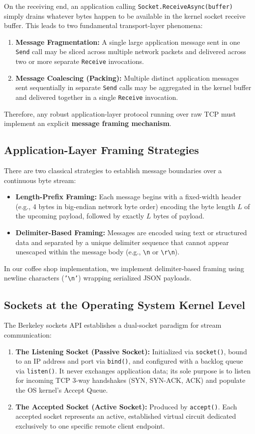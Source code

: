 \documentclass[12pt,a4paper]{article}
\begin{document}
On the receiving end, an application calling \texttt{Socket.ReceiveAsync(buffer)} simply drains whatever bytes happen to be available in the kernel socket receive buffer. This leads to two fundamental transport-layer phenomena:
\begin{enumerate}
    \item \textbf{Message Fragmentation:} A single large application message sent in one \texttt{Send} call may be sliced across multiple network packets and delivered across two or more separate \texttt{Receive} invocations.
    \item \textbf{Message Coalescing (Packing):} Multiple distinct application messages sent sequentially in separate \texttt{Send} calls may be aggregated in the kernel buffer and delivered together in a single \texttt{Receive} invocation.
\end{enumerate}
Therefore, any robust application-layer protocol running over raw TCP must implement an explicit \textbf{message framing mechanism}.

\subsection{Application-Layer Framing Strategies}
There are two classical strategies to establish message boundaries over a continuous byte stream:
\begin{itemize}
    \item \textbf{Length-Prefix Framing:} Each message begins with a fixed-width header (e.g., 4 bytes in big-endian network byte order) encoding the byte length $L$ of the upcoming payload, followed by exactly $L$ bytes of payload.
    \item \textbf{Delimiter-Based Framing:} Messages are encoded using text or structured data and separated by a unique delimiter sequence that cannot appear unescaped within the message body (e.g., \texttt{\textbackslash n} or \texttt{\textbackslash r\textbackslash n}).
\end{itemize}
In our coffee shop implementation, we implement delimiter-based framing using newline characters (\texttt{'\textbackslash n'}) wrapping serialized JSON payloads.

\subsection{Sockets at the Operating System Kernel Level}
The Berkeley sockets API establishes a dual-socket paradigm for stream communication:
\begin{enumerate}
    \item \textbf{The Listening Socket (Passive Socket):} Initialized via \texttt{socket()}, bound to an IP address and port via \texttt{bind()}, and configured with a backlog queue via \texttt{listen()}. It never exchanges application data; its sole purpose is to listen for incoming TCP 3-way handshakes (SYN, SYN-ACK, ACK) and populate the OS kernel's Accept Queue.
    \item \textbf{The Accepted Socket (Active Socket):} Produced by \texttt{accept()}. Each accepted socket represents an active, established virtual circuit dedicated exclusively to one specific remote client endpoint.
\end{enumerate}
\end{document}
